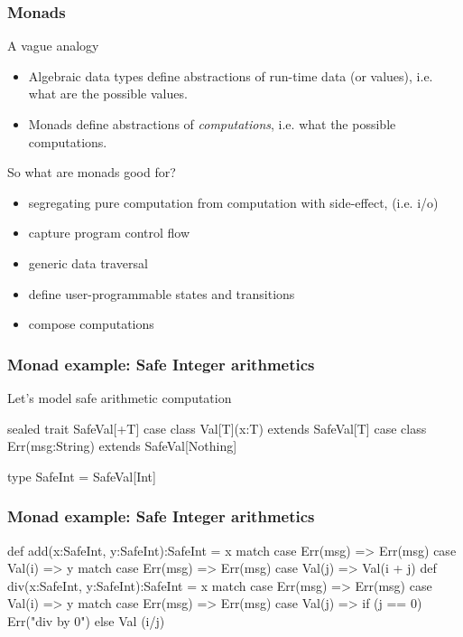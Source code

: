 \documentclass{beamer}
\newcommand{\beb}{\begin{exampleblock}}
\newcommand{\eeb}{\end{exampleblock}}
\begin{document}
\begin{frame}[fragile]
\frametitle{Monads}
A vague analogy 
\begin{itemize}
\item Algebraic data types define abstractions of run-time data (or
  values), i.e. what are the possible values.
\item Monads define abstractions of {\em computations}, i.e. what the
  possible computations.
\end{itemize}
So what are monads good for? 
\begin{itemize}
\item segregating pure computation from computation with side-effect,
  (i.e. i/o)
\item capture program control flow
\item generic data traversal
\item define user-programmable states and transitions
\item compose computations
\end{itemize}
\end{frame}

\begin{frame}[fragile]
\frametitle{Monad example: Safe Integer arithmetics}
Let's model safe arithmetic computation
\beb{}
\begin{code}
sealed trait SafeVal[+T] 
case class Val[T](x:T) extends SafeVal[T]
case class Err(msg:String) extends SafeVal[Nothing]

type SafeInt = SafeVal[Int]
\end{code}
\eeb{}
\end{frame}

\begin{frame}[fragile]
\frametitle{Monad example: Safe Integer arithmetics}
\beb{}
\begin{code}
def add(x:SafeInt, y:SafeInt):SafeInt = x match {
  case Err(msg) => Err(msg)
  case Val(i) => y match {
    case Err(msg) => Err(msg)
    case Val(j) => Val(i + j)
  }
}
def div(x:SafeInt, y:SafeInt):SafeInt = x match  {
  case Err(msg) => Err(msg)
  case Val(i) => y match {
    case Err(msg) => Err(msg)
    case Val(j) => { 
        if (j == 0) {Err("div by 0")} else {Val (i/j)}
    }
  }
}
\end{code}
\eeb{}
\end{frame}
\end{document}
